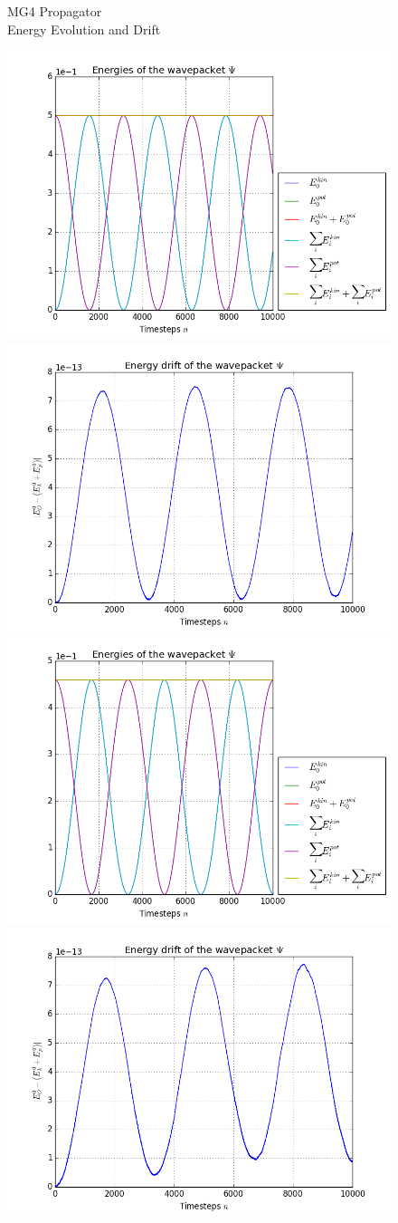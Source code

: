 \begin{figure}[ht]
	\centering
	\begin{minipage}[c]{\textwidth}
		\begin{center}
			\large MG4 Propagator \\[1mm]
			\normalsize Energy Evolution and Drift
			\vspace{4mm}
		\end{center}
	\end{minipage}
	\includegraphics[width=.45\textwidth]{figures/harmonic_1D_MG4_energies.png}
	\includegraphics[width=.45\textwidth]{figures/harmonic_1D_MG4_drift.png} \\
	\includegraphics[width=.45\textwidth]{figures/torsional_1D_MG4_energies.png}
	\includegraphics[width=.45\textwidth]{figures/torsional_1D_MG4_drift.png} \\

\end{figure}
